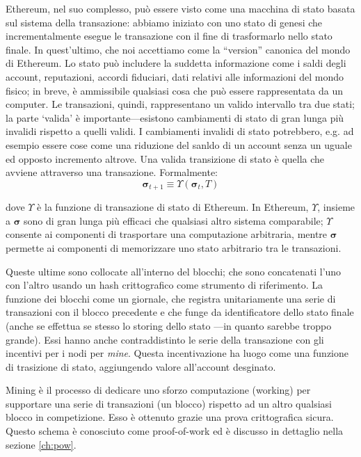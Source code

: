 \documentclass[9pt,oneside]{amsart}
\makeatletter
\newcommand*\eg{e.g.\@\xspace}
\makeatother
\begin{document}
\begin{multicols}{2}
Ethereum, nel suo complesso, può essere visto come una macchina di stato basata sul sistema della transazione: abbiamo iniziato con uno stato di genesi che incrementalmente esegue le transazione con il fine di trasformarlo nello stato finale. In quest'ultimo, che noi accettiamo come la ``version'' canonica del mondo di Ethereum. Lo stato può includere la suddetta informazione come i saldi degli account, reputazioni, accordi fiduciari, dati relativi alle informazioni del mondo fisico; in breve, è ammissibile qualsiasi cosa che può essere rappresentata da un computer. Le transazioni, quindi, rappresentano un valido intervallo tra due stati; la parte `valida' è importante---esistono cambiamenti di stato di gran lunga più invalidi rispetto a quelli validi. I cambiamenti invalidi di stato potrebbero, \eg ad esempio essere cose come una riduzione del sanldo di un account senza un uguale ed opposto incremento altrove. Una valida transizione di stato è quella che avviene attraverso una transazione. Formalmente:
\begin{equation}
\boldsymbol{\sigma}_{t+1} \equiv \Upsilon(\boldsymbol{\sigma}_t, T)
\end{equation}

dove $\Upsilon$ è la funzione di transazione di stato di Ethereum. In Ethereum, $\Upsilon$, insieme a $\boldsymbol{\sigma}$ sono di gran lunga più efficaci che qualsiasi altro sistema comparabile; $\Upsilon$ consente ai componenti di trasportare una computazione arbitraria, mentre $\boldsymbol{\sigma}$ permette ai componenti di memorizzare uno stato arbitrario tra le transazioni.

Queste ultime sono collocate all'interno del blocchi; che sono concatenati l'uno con l'altro usando un hash crittografico come strumento di riferimento. La funzione dei blocchi come un giornale, che registra unitariamente una serie di transazioni con il blocco precedente e che funge da identificatore dello stato finale (anche se effettua se stesso lo storing dello stato ---in quanto sarebbe troppo grande). Essi hanno anche contraddistinto le serie della transazione con gli incentivi per i nodi per \textit{mine}. Questa incentivazione ha luogo come una funzione di trasizione di stato, aggiungendo valore all'account desginato.

Mining è il processo di dedicare uno sforzo computazione (working) per supportare una serie di transazioni (un blocco) rispetto ad un altro qualsiasi blocco in competizione. Esso è ottenuto grazie una prova crittografica sicura. Questo schema è conosciuto come proof-of-work ed è discusso in dettaglio nella sezione \ref{ch:pow}.


\end{multicols}
\end{document}
